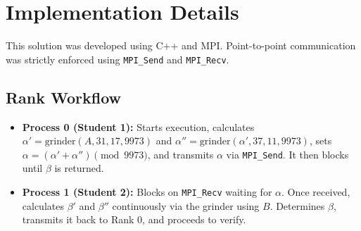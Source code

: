 \documentclass[11pt]{article}
\begin{document}
\section{Implementation Details}

This solution was developed using C++ and MPI. Point-to-point communication was strictly enforced using \texttt{MPI\_Send} and \texttt{MPI\_Recv}. 

\subsection{Rank Workflow}
\begin{itemize}
    \item \textbf{Process 0 (Student 1):} Starts execution, calculates $\alpha' = \text{grinder}(A, 31, 17, 9973)$ and $\alpha'' = \text{grinder}(\alpha', 37, 11, 9973)$, sets $\alpha = (\alpha' + \alpha'') \pmod{9973}$, and transmits $\alpha$ via \texttt{MPI\_Send}. It then blocks until $\beta$ is returned.
    \item \textbf{Process 1 (Student 2):} Blocks on \texttt{MPI\_Recv} waiting for $\alpha$. Once received, calculates $\beta'$ and $\beta''$ continuously via the grinder using $B$. Determines $\beta$, transmits it back to Rank 0, and proceeds to verify.
\end{itemize}
\end{document}

